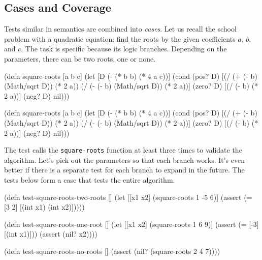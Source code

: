 \subsection{Cases and Coverage}


Tests similar in semantics are combined into \emph{cases}. Let us recall the school problem with a quadratic equation: find the roots by the given coefficients $a$, $b$, and $c$. The task is specific because its logic branches. Depending on the parameters, there can be two roots, one or none.


\ifnarrow

\begin{english}
  \begin{clojure}
(defn square-roots [a b c]
  (let [D (- (* b b) (* 4 a c))]
    (cond
      (pos? D)
      [(/ (+ (- b) (Math/sqrt D))
          (* 2 a))
       (/ (- (- b) (Math/sqrt D))
          (* 2 a))]
      (zero? D) [(/ (- b) (* 2 a))]
      (neg? D) nil)))
  \end{clojure}
\end{english}

\else

\begin{english}
  \begin{clojure}
(defn square-roots [a b c]
  (let [D (- (* b b) (* 4 a c))]
    (cond
      (pos? D) [(/ (+ (- b) (Math/sqrt D)) (* 2 a))
                (/ (- (- b) (Math/sqrt D)) (* 2 a))]
      (zero? D) [(/ (- b) (* 2 a))]
      (neg? D) nil)))
  \end{clojure}
\end{english}

\fi


The test calls the \verb|square-roots| function at least three times to validate the algorithm. Let's pick out the parameters so that each branch works. It's even better if there is a separate test for each branch to expand in the future. The tests below form a case that tests the entire algorithm.

\ifnarrow

\begin{english}
  \begin{clojure}
(defn test-square-roots-two-roots []
  (let [[x1 x2] (square-roots 1 -5 6)]
    (assert
      (= [3 2]
         [(int x1) (int x2)]))))

(defn test-square-roots-one-root []
  (let [[x1 x2] (square-roots 1 6 9)]
    (assert (= [-3] [(int x1)]))
    (assert (nil? x2))))

(defn test-square-roots-no-roots []
  (assert (nil? (square-roots 2 4 7))))
  \end{clojure}
\end{english}

